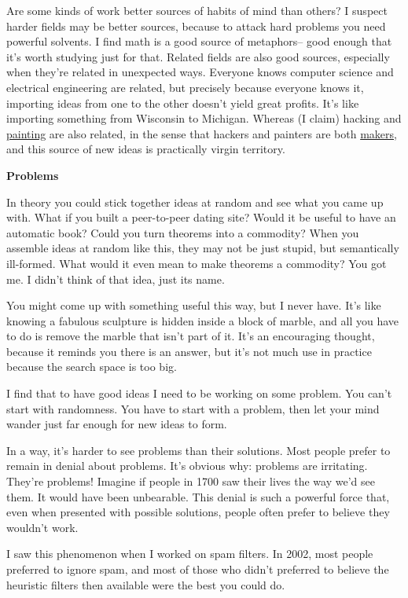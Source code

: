 Are some kinds of work better sources of habits of mind than others? I
suspect harder fields may be better sources, because to attack hard
problems you need powerful solvents. I find math is a good source of
metaphors-- good enough that it's worth studying just for that. Related
fields are also good sources, especially when they're related in
unexpected ways. Everyone knows computer science and electrical
engineering are related, but precisely because everyone knows it,
importing ideas from one to the other doesn't yield great profits. It's
like importing something from Wisconsin to Michigan. Whereas (I claim)
hacking and \href{hp.html}{painting} are also related, in the sense that
hackers and painters are both \href{taste.html}{makers}, and this source
of new ideas is practically virgin territory.

\textbf{Problems}

In theory you could stick together ideas at random and see what you came
up with. What if you built a peer-to-peer dating site? Would it be
useful to have an automatic book? Could you turn theorems into a
commodity? When you assemble ideas at random like this, they may not be
just stupid, but semantically ill-formed. What would it even mean to
make theorems a commodity? You got me. I didn't think of that idea, just
its name.

You might come up with something useful this way, but I never have. It's
like knowing a fabulous sculpture is hidden inside a block of marble,
and all you have to do is remove the marble that isn't part of it. It's
an encouraging thought, because it reminds you there is an answer, but
it's not much use in practice because the search space is too big.

I find that to have good ideas I need to be working on some problem. You
can't start with randomness. You have to start with a problem, then let
your mind wander just far enough for new ideas to form.

In a way, it's harder to see problems than their solutions. Most people
prefer to remain in denial about problems. It's obvious why: problems
are irritating. They're problems! Imagine if people in 1700 saw their
lives the way we'd see them. It would have been unbearable. This denial
is such a powerful force that, even when presented with possible
solutions, people often prefer to believe they wouldn't work.

I saw this phenomenon when I worked on spam filters. In 2002, most
people preferred to ignore spam, and most of those who didn't preferred
to believe the heuristic filters then available were the best you could
do.

